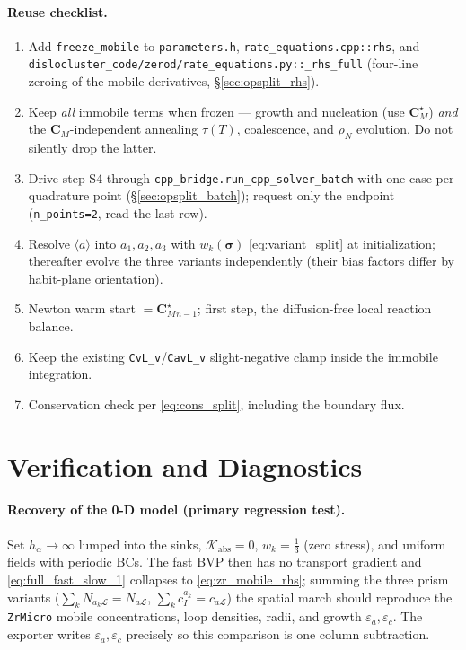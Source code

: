 \documentclass[11pt]{article}
\newcommand{\CM}{\mathbf{C}_{M}}
\newcommand{\sig}{\bm{\sigma}}
\newcommand{\eps}{\varepsilon}
\newcommand{\Lcal}{\mathcal{L}}
\newcommand{\ZrMicro}{\texttt{ZrMicro}}
\newcommand{\code}[1]{\texttt{#1}}
\begin{document}
\paragraph{Reuse checklist.}
\begin{enumerate}[label=(\alph*),leftmargin=1.6em,itemsep=1pt]
\item Add \code{freeze\_mobile} to \code{parameters.h}, \code{rate\_equations.cpp::rhs},
and \code{dislocluster\_code/zerod/rate\_equations.py::\_rhs\_full} (four-line zeroing of the
mobile derivatives, \S\ref{sec:opsplit_rhs}).
\item Keep \emph{all} immobile terms when frozen --- growth and nucleation (use
$\CM^\star$) \emph{and} the $\CM$-independent annealing $\tau(T)$, coalescence,
and $\rho_N$ evolution. Do not silently drop the latter.
\item Drive step S4 through \code{cpp\_bridge.run\_cpp\_solver\_batch} with one
case per quadrature point (\S\ref{sec:opsplit_batch}); request only the endpoint
(\code{n\_points=2}, read the last row).
\item Resolve $\langle a\rangle$ into $a_1,a_2,a_3$ with $w_k(\sig)$
\eqref{eq:variant_split} at initialization; thereafter evolve the three variants
independently (their bias factors differ by habit-plane orientation).
\item Newton warm start $=\CM^\star_{n-1}$; first step, the diffusion-free local
reaction balance.
\item Keep the existing \code{CvL\_v}/\code{CavL\_v} slight-negative clamp inside
the immobile integration.
\item Conservation check per \eqref{eq:cons_split}, including the boundary flux.
\end{enumerate}

\section{Verification and Diagnostics}
\label{sec:verify}

\paragraph{Recovery of the 0-D model (primary regression test).}
Set $h_\alpha\to\infty$ lumped into the sinks, $\mathcal K_{\mathrm{abs}}=0$,
$w_k=\tfrac13$ (zero stress), and uniform fields with periodic BCs. The fast BVP
then has no transport gradient and \eqref{eq:full_fast_slow_1} collapses to
\eqref{eq:zr_mobile_rhs}; summing the three prism variants
($\sum_k N_{a_k\Lcal}=N_{a\Lcal}$, $\sum_k c^{a_k}_I=c_{a\Lcal}$) the spatial
march should reproduce the \ZrMicro{} mobile concentrations, loop densities,
radii, and growth $\eps_a,\eps_c$. The exporter writes $\eps_a,\eps_c$ precisely
so this comparison is one column subtraction.
\end{document}
